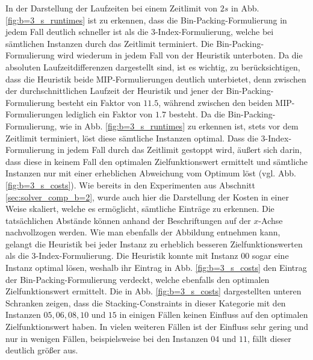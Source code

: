 In der Darstellung der Laufzeiten bei einem Zeitlimit von $2s$ in Abb. \ref{fig:b=3_s_runtimes} ist zu erkennen,
dass die Bin-Packing-Formulierung in jedem Fall deutlich schneller ist als die 3-Index-Formulierung, welche bei sämtlichen Instanzen durch das Zeitlimit terminiert. Die Bin-Packing-Formulierung wird wiederum in jedem Fall
von der Heuristik unterboten. Da die absoluten Laufzeitdifferenzen dargestellt sind, ist es wichtig,
zu berücksichtigen, dass die Heuristik beide MIP-Formulierungen deutlich unterbietet, denn zwischen der durchschnittlichen Laufzeit der Heuristik und jener der Bin-Packing-Formulierung besteht ein
Faktor von $11.5$, während zwischen den beiden MIP-Formulierungen lediglich ein Faktor von $1.7$ besteht.
Da die Bin-Packing-Formulierung, wie in Abb. \ref{fig:b=3_s_runtimes} zu erkennen ist, stets vor dem Zeitlimit terminiert, löst diese sämtliche Instanzen optimal. Dass die 3-Index-Formulierung in jedem Fall durch das Zeitlimit gestoppt wird, äußert sich darin, dass diese in keinem Fall den optimalen Zielfunktionswert ermittelt und sämtliche Instanzen nur mit einer erheblichen Abweichung vom Optimum löst (vgl. Abb. \ref{fig:b=3_s_costs}).
Wie bereits in den Experimenten aus Abschnitt \ref{sec:solver_comp_b=2}, wurde auch hier die Darstellung der Kosten
in einer Weise skaliert, welche es ermöglicht, sämtliche Einträge zu erkennen. Die tatsächlichen Abstände können anhand der Beschriftungen auf der $x$-Achse nachvollzogen werden.
Wie man ebenfalls der Abbildung entnehmen kann, gelangt die Heuristik bei jeder Instanz zu erheblich besseren Zielfunktionswerten als die 3-Index-Formulierung. Die Heuristik konnte mit Instanz $00$ sogar eine Instanz optimal lösen, weshalb ihr Eintrag in Abb. \ref{fig:b=3_s_costs} den Eintrag der Bin-Packing-Formulierung verdeckt,
welche ebenfalls den optimalen Zielfunktionswert ermittelt.
Die in Abb. \ref{fig:b=3_s_costs} dargestellten unteren Schranken zeigen, dass die Stacking-Constraints in dieser Kategorie mit den Instanzen $05, 06, 08, 10$ und $15$ in einigen Fällen keinen Einfluss auf den optimalen Zielfunktionswert haben. In vielen weiteren Fällen ist der Einfluss sehr gering und nur in wenigen Fällen, beispielsweise bei den Instanzen $04$ und $11$, fällt dieser deutlich größer aus.

